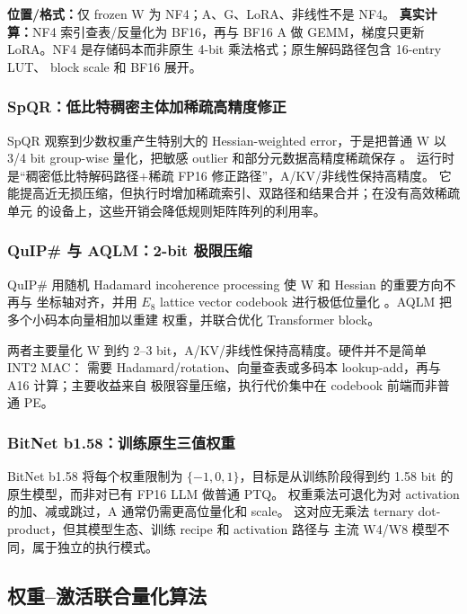 \textbf{位置/格式：}仅 frozen W 为 NF4；A、G、LoRA、非线性不是 NF4。
\textbf{真实计算：}NF4 索引查表/反量化为 BF16，再与 BF16 A 做 GEMM，梯度只更新
LoRA。NF4 是存储码本而非原生 4-bit 乘法格式；原生解码路径包含 16-entry LUT、
block scale 和 BF16 展开。

\subsubsection{SpQR：低比特稠密主体加稀疏高精度修正}

SpQR 观察到少数权重产生特别大的 Hessian-weighted error，于是把普通 W 以 3/4 bit
group-wise 量化，把敏感 outlier 和部分元数据高精度稀疏保存
。
运行时是“稠密低比特解码路径+稀疏 FP16 修正路径”，A/KV/非线性保持高精度。
它能提高近无损压缩，但执行时增加稀疏索引、双路径和结果合并；在没有高效稀疏单元
的设备上，这些开销会降低规则矩阵阵列的利用率。

\subsubsection{QuIP\# 与 AQLM：2-bit 极限压缩}

QuIP\# 用随机 Hadamard incoherence processing 使 W 和 Hessian 的重要方向不再与
坐标轴对齐，并用 $E_8$ lattice vector codebook 进行极低位量化
。AQLM 把多个小码本向量相加以重建
权重，并联合优化 Transformer block。

两者主要量化 W 到约 2--3 bit，A/KV/非线性保持高精度。硬件并不是简单 INT2 MAC：
需要 Hadamard/rotation、向量查表或多码本 lookup-add，再与 A16 计算；主要收益来自
极限容量压缩，执行代价集中在 codebook 前端而非普通 PE。

\subsubsection{BitNet b1.58：训练原生三值权重}

BitNet b1.58 将每个权重限制为 $\{-1,0,1\}$，目标是从训练阶段得到约 1.58 bit 的
原生模型，而非对已有 FP16 LLM 做普通 PTQ。
权重乘法可退化为对 activation 的加、减或跳过，A 通常仍需更高位量化和 scale。
这对应无乘法 ternary dot-product，但其模型生态、训练 recipe 和 activation 路径与
主流 W4/W8 模型不同，属于独立的执行模式。

\subsection{权重--激活联合量化算法}

